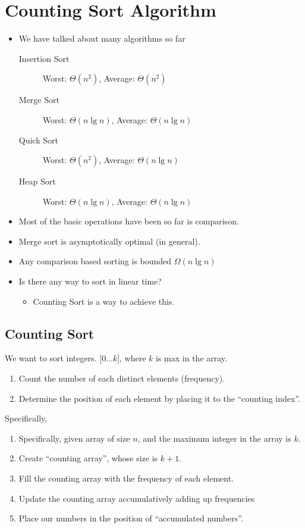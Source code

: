 \documentclass{article}
\begin{document}
\setcounter{section}{7}
\section{Counting Sort Algorithm}
\begin{itemize}
    \item We have talked about many algorithms so far
    \begin{description}
        \item [Insertion Sort] Worst: $\Theta(n^2)$, Average: $
        \Theta(n^2)$
        \item [Merge Sort] Worst: $\Theta(n \lg n)$, Average: $
        \Theta(n \lg n)$
        \item [Quick Sort] Worst: $\Theta(n^2)$, Average: $
        \Theta(n \lg n)$
        \item [Heap Sort] Worst: $\Theta(n \lg n)$, Average: $
        \Theta(n \lg n)$
    \end{description}
    \item Most of the basic operations have been so far is comparison.
    \item Merge sort is asymptotically optimal (in general).
    \item Any comparison based sorting is bounded $\Omega (n \lg n)$
    \item Is there any way to sort in linear time?
    \begin{itemize}
        \item Counting Sort is a way to achieve this.
    \end{itemize}
\end{itemize}

\subsection{Counting Sort}
 We want to sort integers. [$0 \ldots k$], where $k$ is max in the array.

\begin{enumerate}
    \item Count the number of each distinct elements (frequency).
    \item Determine the position of each element by placing it to the ``counting index''.
\end{enumerate}

Specifically,

\begin{enumerate}
    \item Specifically, given array of size $n$, and the maximum integer in the array is $k$.
    \item Create ``counting array'', whose size is $k + 1$.
    \item Fill the counting array with the frequency of each element.
    \item Update the counting array accumulatively adding up frequencies
    \item Place our numbers in the position of ``accumulated numbers''.
\end{enumerate}
\end{document}
